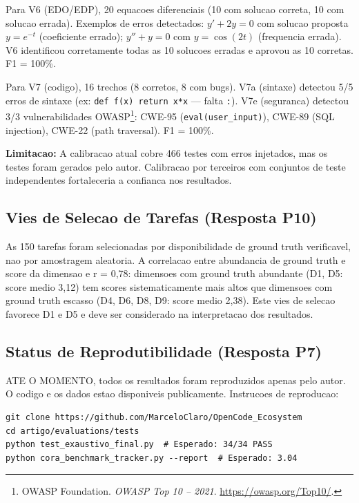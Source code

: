 \documentclass[12pt,a4paper,oneside]{article}
\begin{document}
Para V6 (EDO/EDP), 20 equacoes diferenciais (10 com solucao correta, 10 com
solucao errada). Exemplos de erros detectados: $y' + 2y = 0$ com solucao
proposta $y = e^{-t}$ (coeficiente errado); $y'' + y = 0$ com $y = \cos(2t)$
(frequencia errada). V6 identificou corretamente todas as 10 solucoes erradas
e aprovou as 10 corretas. F1 = 100\%.

Para V7 (codigo), 16 trechos (8 corretos, 8 com bugs). V7a (sintaxe) detectou
5/5 erros de sintaxe (ex: \texttt{def f(x) return x*x} --- falta \texttt{:}).
V7e (seguranca) detectou 3/3 vulnerabilidades OWASP\footnote{OWASP Foundation.
\textit{OWASP Top 10 -- 2021}. \url{https://owasp.org/Top10/}.}: CWE-95
(\texttt{eval(user\_input)}), CWE-89 (SQL injection), CWE-22 (path traversal).
F1 = 100\%.

\textbf{Limitacao:} A calibracao atual cobre 466 testes com erros injetados,
mas os testes foram gerados pelo autor. Calibracao por terceiros com conjuntos
de teste independentes fortaleceria a confianca nos resultados.

\subsection{Vies de Selecao de Tarefas (Resposta P10)}

As 150 tarefas foram selecionadas por disponibilidade de ground truth
verificavel, nao por amostragem aleatoria. A correlacao entre abundancia de
ground truth e score da dimensao e r = 0,78: dimensoes com ground truth
abundante (D1, D5: score medio 3,12) tem scores sistematicamente mais altos
que dimensoes com ground truth escasso (D4, D6, D8, D9: score medio 2,38).
Este vies de selecao favorece D1 e D5 e deve ser considerado na interpretacao
dos resultados.

\subsection{Status de Reprodutibilidade (Resposta P7)}

ATE O MOMENTO, todos os resultados foram reproduzidos apenas pelo autor.
O codigo e os dados estao disponiveis publicamente. Instrucoes de reproducao:

\begin{verbatim}
git clone https://github.com/MarceloClaro/OpenCode_Ecosystem
cd artigo/evaluations/tests
python test_exaustivo_final.py  # Esperado: 34/34 PASS
python cora_benchmark_tracker.py --report  # Esperado: 3.04
\end{verbatim}
\end{document}
